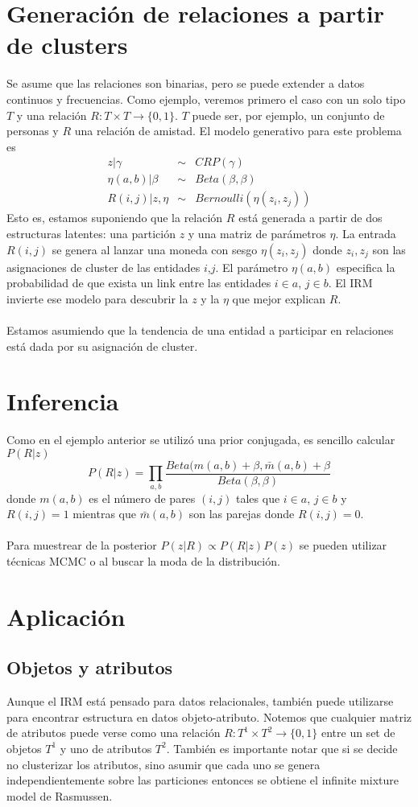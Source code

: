 \documentclass[11pt]{article}
\theoremstyle{plain}
\begin{document}
\section{Generación de relaciones a partir de clusters}
Se asume que las relaciones son binarias, pero se puede extender a datos continuos y frecuencias. Como ejemplo, veremos primero el caso con un solo tipo $T$ y una relación $R: T \times T \to \{0,1 \}$. $T$ puede ser, por ejemplo, un conjunto de personas y $R$ una relación de amistad. El modelo generativo para este problema es
\begin{eqnarray*}
z | \gamma &\sim& CRP(\gamma)\\
\eta(a,b) | \beta &\sim& Beta(\beta,\beta)\\
R(i,j) | z, \eta &\sim& Bernoulli(\eta(z_i,z_j))
\end{eqnarray*}
Esto es, estamos suponiendo que la relación $R$ está generada a partir de dos estructuras latentes: una partición $z$ y una matriz de parámetros $\eta$. La entrada $R(i,j)$ se genera al lanzar una moneda con sesgo $\eta(z_i,z_j)$ donde $z_i,z_j$ son las asignaciones de cluster de las entidades $i$,$j$. El parámetro $\eta(a,b)$ especifica la probabilidad de que exista un link entre las entidades $i \in a$, $j \in b$. El IRM invierte ese modelo para descubrir la $z$ y la $\eta$ que mejor explican $R$.\\
\\
Estamos asumiendo que la tendencia de una entidad a participar en relaciones está dada por su asignación de cluster.
\section{Inferencia}
Como en el ejemplo anterior se utilizó una prior conjugada, es sencillo calcular $P(R|z)$
\[ P(R|z)= \prod_{a,b} \frac{Beta(m(a,b) + \beta, \bar{m}(a,b)+\beta}{Beta(\beta,\beta)} \]
donde $m(a,b)$ es el número de pares $(i,j)$ tales que $i \in a$, $j \in b$ y $R(i,j)=1$ mientras que $\bar{m}(a,b)$ son las parejas donde $R(i,j)=0.$\\
\\
Para muestrear de la posterior $P(z | R ) \propto P(R|z)P(z)$ se pueden utilizar técnicas MCMC o al buscar la moda de la distribución.
\section{Aplicación}
\subsection{Objetos y atributos}
Aunque el IRM está pensado para datos relacionales, también puede utilizarse para encontrar estructura en datos objeto-atributo. Notemos que cualquier matriz de atributos puede verse como una relación $R: T^1 \times T^2 \to \{0,1 \}$ entre un set de objetos $T^1$ y uno de atributos $T^2$. También es importante notar que si se decide no clusterizar los atributos, sino asumir que cada uno se genera independientemente sobre las particiones entonces se obtiene el infinite mixture model de Rasmussen.
\end{document}
